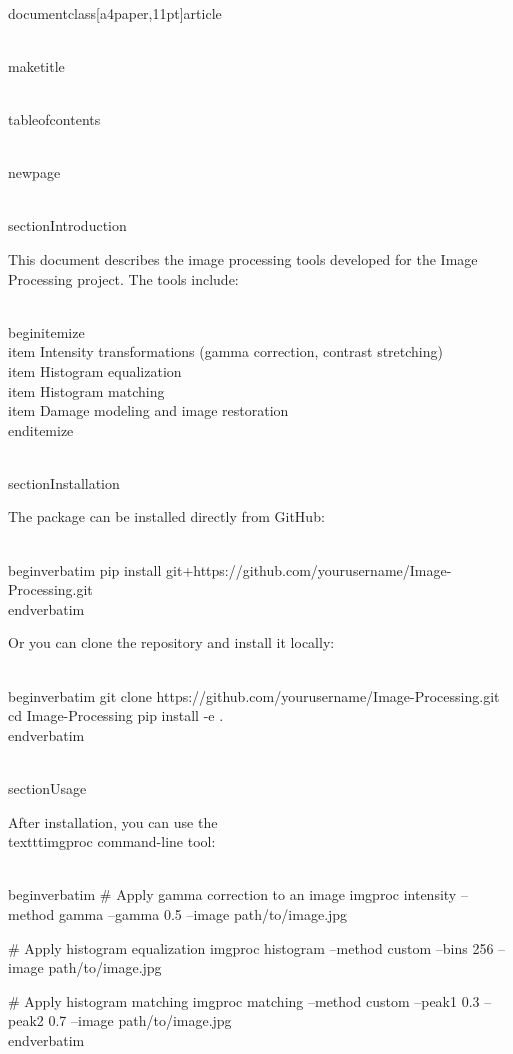 \\documentclass[a4paper,11pt]{article}
\begin{document}
\\maketitle

\\tableofcontents

\\newpage

\\section{Introduction}

This document describes the image processing tools developed for the Image Processing project. The tools include:

\\begin{itemize}
\\item Intensity transformations (gamma correction, contrast stretching)
\\item Histogram equalization
\\item Histogram matching
\\item Damage modeling and image restoration
\\end{itemize}

\\section{Installation}

The package can be installed directly from GitHub:

\\begin{verbatim}
pip install git+https://github.com/yourusername/Image-Processing.git
\\end{verbatim}

Or you can clone the repository and install it locally:

\\begin{verbatim}
git clone https://github.com/yourusername/Image-Processing.git
cd Image-Processing
pip install -e .
\\end{verbatim}

\\section{Usage}

After installation, you can use the \\texttt{imgproc} command-line tool:

\\begin{verbatim}
# Apply gamma correction to an image
imgproc intensity --method gamma --gamma 0.5 --image path/to/image.jpg

# Apply histogram equalization
imgproc histogram --method custom --bins 256 --image path/to/image.jpg

# Apply histogram matching
imgproc matching --method custom --peak1 0.3 --peak2 0.7 --image path/to/image.jpg
\\end{verbatim}
\end{document}
